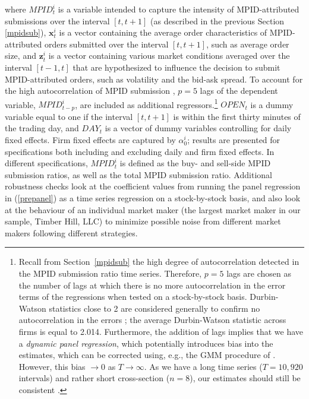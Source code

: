 \documentclass{article}
\begin{document}
\noindent where $MPID_t^i$ is a variable intended to capture the intensity of MPID-attributed submissions over the interval $[t,t+1]$ (as described in the previous Section \ref{mpidsub}), $\textbf{x}_t^i$ is a vector containing the average order characteristics of MPID-attributed orders submitted over the interval $[t,t+1]$, such as average order size, and $\textbf{z}_t^i$ is a vector containing various market conditions averaged over the interval $[t-1,t]$ that are hypothesized to influence the decision to submit MPID-attributed orders, such as volatility and the bid-ask spread. To account for the high autocorrelation of MPID submission , $p=5$ lags of the dependent variable, $MPID_{t-p}^i$, are included as additional regressors.\footnote{Recall from Section~\ref{mpidsub} the high degree of autocorrelation detected in the MPID submission ratio time series. Therefore, $p=5$ lags are chosen as the number of lags at which there is no more autocorrelation in the error terms of the regressions when tested on a stock-by-stock basis. Durbin-Watson statistics close to 2 are considered generally to confirm no autocorrelation in the errors \citep[see, e.g.,][]{gujarati2004basic}; the average Durbin-Watson statistic across firms is equal to 2.014. Furthermore, the addition of lags implies that we have a \emph{dynamic panel regression}, which potentially introduces bias into the estimates, which can be corrected using, e.g., the GMM procedure of \citet{arellano1991some}. However, this bias $\rightarrow 0$ as $T \rightarrow \infty$. As we have a long time series ($T=10,920$ intervals) and rather short cross-section ($n=8$), our estimates should still be consistent \citep[see, e.g.,][p. 135]{baltagi2008econometric}.} $OPEN_t$ is a dummy variable equal to one if the interval $[t,t+1]$ is within the first thirty minutes of the trading day, and $DAY_t$ is a vector of dummy variables controlling for daily fixed effects. Firm fixed effects are captured by $\alpha_0^i$; results are presented for specifications both including and excluding daily and firm fixed effects. In different specifications, $MPID_t^i$ is defined as the buy- and sell-side MPID submission ratios, as well as the total MPID submission ratio. Additional robustness checks look at the coefficient values from running the panel regression in (\ref{prepanel}) as a time series regression on a stock-by-stock basis, and also look at the behaviour of an individual market maker (the largest market maker in our sample, Timber Hill, LLC) to minimize possible noise from different market makers following different strategies.
\end{document}
